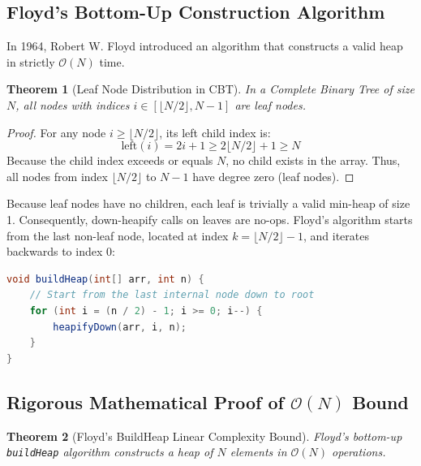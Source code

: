 \documentclass[10pt,twocolumn,letterpaper]{article}
\newtheorem{theorem}{Theorem}
\begin{document}
\subsection{Floyd's Bottom-Up Construction Algorithm}
In 1964, Robert W. Floyd introduced an algorithm that constructs a valid heap in strictly $\mathcal{O}(N)$ time.

\begin{theorem}[Leaf Node Distribution in CBT]
In a Complete Binary Tree of size $N$, all nodes with indices $i \in [\lfloor N/2 \rfloor, N-1]$ are leaf nodes.
\end{theorem}
\begin{proof}
For any node $i \ge \lfloor N/2 \rfloor$, its left child index is:
\begin{equation}
\text{left}(i) = 2i + 1 \ge 2 \lfloor N/2 \rfloor + 1 \ge N
\end{equation}
Because the child index exceeds or equals $N$, no child exists in the array. Thus, all nodes from index $\lfloor N/2 \rfloor$ to $N-1$ have degree zero (leaf nodes).
\end{proof}

Because leaf nodes have no children, each leaf is trivially a valid min-heap of size 1. Consequently, down-heapify calls on leaves are no-ops. Floyd's algorithm starts from the last non-leaf node, located at index $k = \lfloor N/2 \rfloor - 1$, and iterates backwards to index $0$:
\begin{lstlisting}[language=Java,caption={Floyd's $\mathcal{O}(N)$ In-Place BuildHeap}]
void buildHeap(int[] arr, int n) {
    // Start from the last internal node down to root
    for (int i = (n / 2) - 1; i >= 0; i--) {
        heapifyDown(arr, i, n);
    }
}
\end{lstlisting}

\subsection{Rigorous Mathematical Proof of $\mathcal{O}(N)$ Bound}
\begin{theorem}[Floyd's BuildHeap Linear Complexity Bound]
Floyd's bottom-up \texttt{buildHeap} algorithm constructs a heap of $N$ elements in $\mathcal{O}(N)$ operations.
\end{theorem}
\end{document}
